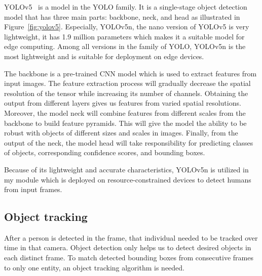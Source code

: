 \documentclass[../main.tex]{subfiles}
\begin{document}
YOLOv5~\cite{glenn_jocher_2022_7347926} is a model in the YOLO family. It is a single-stage object detection model that has three main parts: backbone, neck, and head as illustrated in Figure~\ref{fig:yolov5}. Especially, YOLOv5n, the nano version of YOLOv5 is very lightweight, it has 1.9 million parameters which makes it a suitable model for edge computing. Among all versions in the family of YOLO, YOLOv5n is the most lightweight and is suitable for deployment on edge devices.

The backbone is a pre-trained CNN model which is used to extract features from input images. The feature extraction process will gradually decrease the spatial resolution of the tensor while increasing its number of channels. Obtaining the output from different layers gives us features from varied spatial resolutions. Moreover, the model neck will combine features from different scales from the backbone to build feature pyramids. This will give the model the ability to be robust with objects of different sizes and scales in images. Finally, from the output of the neck, the model head will take responsibility for predicting classes of objects, corresponding confidence scores, and bounding boxes.

Because of its lightweight and accurate characteristics, YOLOv5n is utilized in my module which is deployed on resource-constrained devices to detect humans from input frames.

\subsection{Object tracking}
\label{sec:objtrack}
After a person is detected in the frame, that individual needed to be tracked over time in that camera. Object detection only helps us to detect desired objects in each distinct frame. To match detected bounding boxes from consecutive frames to only one entity, an object tracking algorithm is needed.
\end{document}

